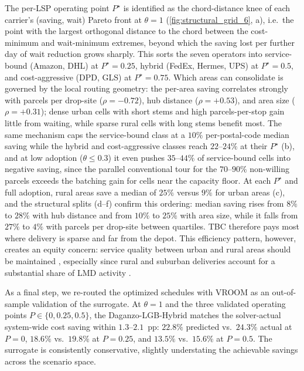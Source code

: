 \documentclass[preprint,12pt,authoryear]{elsarticle}
\begin{document}
The per-LSP operating point $P^\star$ is identified as the chord-distance knee of each carrier's (saving, wait) Pareto front at $\theta = 1$ (\autoref{fig:structural_grid_6}, a), i.e.\ the point with the largest orthogonal distance to the chord between the cost-minimum and wait-minimum extremes, beyond which the saving lost per further day of wait reduction grows sharply. This sorts the seven operators into service-bound (Amazon, DHL) at $P^\star = 0.25$, hybrid (FedEx, Hermes, UPS) at $P^\star = 0.5$, and cost-aggressive (DPD, GLS) at $P^\star = 0.75$. Which areas can consolidate is governed by the local routing geometry: the per-area saving correlates strongly with parcels per drop-site ($\rho = -0.72$), hub distance ($\rho = +0.53$), and area size ($\rho = +0.31$); dense urban cells with short stems and high parcels-per-stop gain little from waiting, while sparse rural cells with long stems benefit most. The same mechanism caps the service-bound class at a $10\%$ per-postal-code median saving while the hybrid and cost-aggressive classes reach $22$--$24\%$ at their $P^\star$ (b), and at low adoption ($\theta \leq 0.3$) it even pushes $35$--$44\%$ of service-bound cells into negative saving, since the parallel conventional tour for the $70$--$90\%$ non-willing parcels exceeds the batching gain for cells near the capacity floor. At each $P^\star$ and full adoption, rural areas save a median of $25\%$ versus $9\%$ for urban areas (c), and the structural splits (d--f) confirm this ordering: median saving rises from $8\%$ to $28\%$ with hub distance and from $10\%$ to $25\%$ with area size, while it falls from $27\%$ to $4\%$ with parcels per drop-site between quartiles. TBC therefore pays most where delivery is sparse and far from the depot. This efficiency pattern, however, creates an equity concern: service quality between urban and rural areas should be maintained \citep{Pereira04032017}, especially since rural and suburban deliveries account for a substantial share of LMD activity \citep{BIENZEISLER2026104682}. 

As a final step, we re-routed the optimized schedules with VROOM as an out-of-sample validation of the surrogate. At $\theta = 1$ and the three validated operating points $P \in \{0, 0.25, 0.5\}$, the Daganzo-LGB-Hybrid matches the solver-actual system-wide cost saving within $1.3$--$2.1$~pp: $22.8\%$ predicted vs.\ $24.3\%$ actual at $P = 0$, $18.6\%$ vs.\ $19.8\%$ at $P = 0.25$, and $13.5\%$ vs.\ $15.6\%$ at $P = 0.5$. The surrogate is consistently conservative, slightly understating the achievable savings across the scenario space. 
\end{document}
